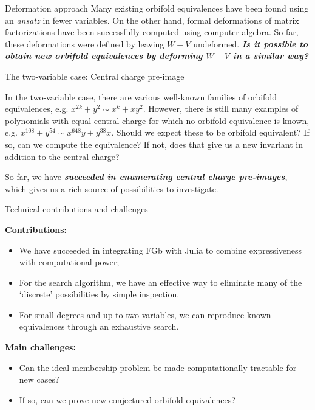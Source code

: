 \documentclass[final]{beamer}
\newlength{\onecolwid}
\begin{document}
\begin{frame}[t]
\begin{columns}[t]
\begin{column}{\onecolwid}
\begin{block}{Deformation approach}
Many existing orbifold equivalences have been found using an \emph{ansatz}
in fewer variables. On the other
hand, formal deformations of matrix factorizations have been successfully
computed using computer algebra. So far, these deformations
were defined by leaving $W-V$ undeformed. \textbf{\emph{Is it possible
to obtain new orbifold equivalences by deforming $W-V$ in a similar
way?}}
\end{block}

\begin{block}{The two-variable case: Central charge pre-image}

In the two-variable case, there are various well-known families of
orbifold equivalences, e.g. $x^{2k}+y^{2}\sim x^{k}+xy^{2}$. However,
there is still many examples of polynomials with equal central charge
for which no orbifold equivalence is known, e.g. $x^{108}+y^{54}\sim x^{648}y+y^{38}x$.
Should we expect these to be orbifold equivalent? If so, can we compute
the equivalence? If not, does that give us a new invariant in addition
to the central charge?

So far, we have \textbf{\emph{succeeded in enumerating central charge
pre-images}}, which gives us a rich source of possibilities\textbf{\emph{
}}to investigate.
\end{block}
%
\begin{block}{Technical contributions and challenges}

{\bf Contributions:}
\begin{itemize}
\item We have succeeded in integrating FGb with Julia to combine expressiveness
with computational power;
\item For the search algorithm, we have an effective way to eliminate many
of the `discrete' possibilities by simple inspection.
\item For small degrees and up to two variables, we can reproduce known equivalences
through an exhaustive search.
\end{itemize}
{\bf Main challenges:}
\begin{itemize}
\item Can the ideal membership problem be made computationally tractable for new cases?
\end{itemize}
\begin{itemize}
\item If so, can we prove new conjectured orbifold equivalences?
\end{itemize}
\end{block}


\end{column}
\end{columns}
\end{frame}
\end{document}
